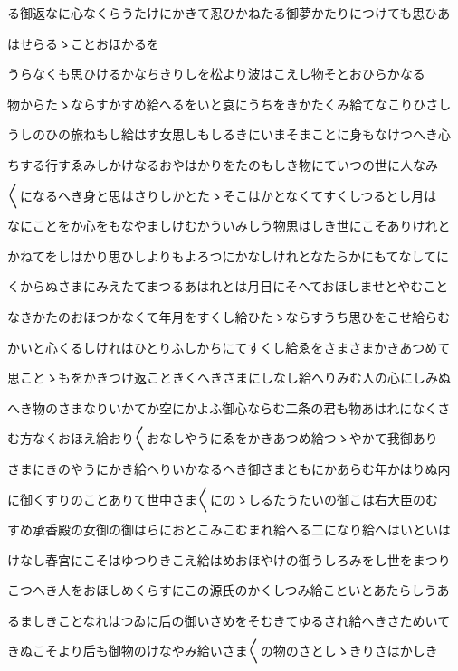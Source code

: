 \documentclass[a4paper,11pt,landscape]{ltjtarticle}
\begin{document}
\par\medskip
る御返なに心なくらうたけにかきて忍ひかねたる御夢かたりにつけても思ひあ
\par\medskip
はせらるゝことおほかるを
\par\medskip
うらなくも思ひけるかなちきりしを松より波はこえし物そとおひらかなる
\par\medskip
物からたゝならすかすめ給へるをいと哀にうちをきかたくみ給てなこりひさし
\par\medskip
うしのひの旅ねもし給はす女思しもしるきにいまそまことに身もなけつへき心
\par\medskip
ちする行すゑみしかけなるおやはかりをたのもしき物にていつの世に人なみ
\par\medskip
〱になるへき身と思はさりしかとたゝそこはかとなくてすくしつるとし月は
\par\medskip
なにことをか心をもなやましけむかういみしう物思はしき世にこそありけれと
\par\medskip
かねてをしはかり思ひしよりもよろつにかなしけれとなたらかにもてなしてに
\par\medskip
くからぬさまにみえたてまつるあはれとは月日にそへておほしませとやむこと
\par\medskip
なきかたのおほつかなくて年月をすくし給ひたゝならすうち思ひをこせ給らむ
\par\medskip
かいと心くるしけれはひとりふしかちにてすくし給ゑをさまさまかきあつめて
\par\medskip
思ことゝもをかきつけ返こときくへきさまにしなし給へりみむ人の心にしみぬ
\par\medskip
へき物のさまなりいかてか空にかよふ御心ならむ二条の君も物あはれになくさ
\par\medskip
む方なくおほえ給おり〱おなしやうにゑをかきあつめ給つゝやかて我御あり
\par\medskip
さまにきのやうにかき給へりいかなるへき御さまともにかあらむ年かはりぬ内
\par\medskip
に御くすりのことありて世中さま〱にのゝしるたうたいの御こは右大臣のむ
\par\medskip
すめ承香殿の女御の御はらにおとこみこむまれ給へる二になり給へはいといは
\par\medskip
けなし春宮にこそはゆつりきこえ給はめおほやけの御うしろみをし世をまつり
\par\medskip
こつへき人をおほしめくらすにこの源氏のかくしつみ給こといとあたらしうあ
\par\medskip
るましきことなれはつゐに后の御いさめをそむきてゆるされ給へきさためいて
\par\medskip
きぬこそより后も御物のけなやみ給いさま〱の物のさとしゝきりさはかしき
\end{document}
